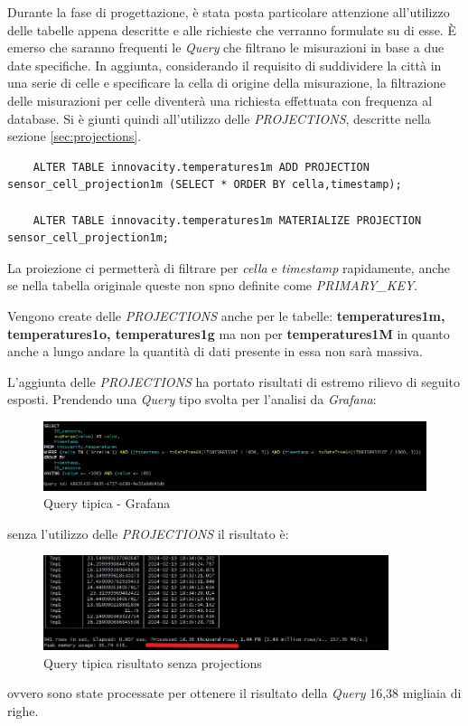     Durante la fase di progettazione, è stata posta particolare attenzione all'utilizzo delle tabelle appena descritte e alle richieste che verranno formulate su di esse. È emerso che saranno frequenti le \textit{Query} che filtrano le misurazioni in base a due date specifiche.
    In aggiunta, considerando il requisito di suddividere la città in una serie di celle e specificare la cella di origine della misurazione, la filtrazione delle misurazioni per celle diventerà una richiesta effettuata con frequenza al database.
    Si è giunti quindi all'utilizzo delle \textit{PROJECTIONS}, descritte nella sezione \ref{sec:projections}.

\begin{verbatim}
    ALTER TABLE innovacity.temperatures1m ADD PROJECTION sensor_cell_projection1m (SELECT * ORDER BY cella,timestamp);

    ALTER TABLE innovacity.temperatures1m MATERIALIZE PROJECTION sensor_cell_projection1m;
\end{verbatim}
    La proiezione ci permetterà di filtrare per \textit{cella} e \textit{timestamp} rapidamente, anche se nella tabella originale queste non spno definite come \textit{PRIMARY\_KEY}.

    Vengono create delle \textit{PROJECTIONS} anche per le tabelle:  \textbf{temperatures1m, temperatures1o, temperatures1g}
    ma non per  \textbf{temperatures1M} in quanto anche a lungo andare la quantità di dati presente in essa non sarà massiva.

    L'aggiunta delle \textit{PROJECTIONS} ha portato risultati di estremo rilievo di seguito esposti.
    Prendendo una \textit{Query} tipo svolta per l'analisi da \textit{Grafana}:
    \begin{figure}[H]
        \centering
        \includegraphics[width=1\textwidth]{../Images/SpecificaTecnica/ProjectionQuery.jpg}
        \caption{Query tipica - Grafana}
        \label{fig:ProjectionsQuery}
      \end{figure}
    senza l'utilizzo delle \textit{PROJECTIONS} il risultato è:
    \begin{figure}[H]
        \centering
        \includegraphics[width=0.9\textwidth]{../Images/SpecificaTecnica/SenzaProectionResult.jpg}
        \caption{Query tipica risultato senza projections}
        \label{fig:ProjectionsQueryWthout}
      \end{figure}
      ovvero sono state processate per ottenere il risultato della \textit{Query} 16,38 migliaia di righe.


